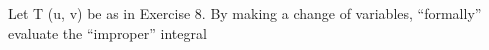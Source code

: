 Let T (u, v) be as in Exercise 8. By making a change of variables, “formally” evaluate the “improper” integral
